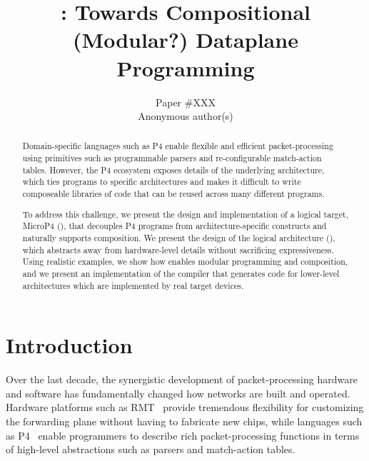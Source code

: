 \documentclass[letterpaper,twocolumn,10pt]{article}
\begin{document}
\date{}
\title{\Large \bf \ulang: Towards Compositional (Modular?) Dataplane Programming}
\author{{\rm Paper \#XXX}\\ Anonymous author(s)}
\maketitle

\begin{abstract}
Domain-specific languages such as P4 enable flexible and efficient
packet-processing using primitives such as programmable parsers and
re-configurable match-action tables. However, the P4 ecosystem exposes
details of the underlying architecture, which ties programs to
specific architectures and makes it difficult to write composeable
libraries of code that can be reused across many different programs.

To address this challenge, we present the design and implementation of
a logical target, MicroP4 (\ulang), that decouples P4 programs from
architecture-specific constructs and naturally supports composition.
We present the design of the \ulang logical architecture (\uarch),
which abstracts away from hardware-level details without sacrificing
expressiveness. Using realistic examples, we show how \ulang enables
modular programming and composition, and we present an implementation
of the \ucomp compiler that generates code for lower-level
architectures which are implemented by real target devices.
\end{abstract}



\section{Introduction}
\label{sec:intro}
Over the last decade, the synergistic development of packet-processing
hardware and software has fundamentally changed how networks are built
and operated. Hardware platforms such as
RMT~\cite{bosshart2013forwarding} provide tremendous flexibility for
customizing the forwarding plane without having to fabricate new
chips, while languages such as P4~\cite{bosshart2014p4, p4lang} enable
programmers to describe rich packet-processing functions in terms of
high-level abstractions such as parsers and match-action tables.
\end{document}
